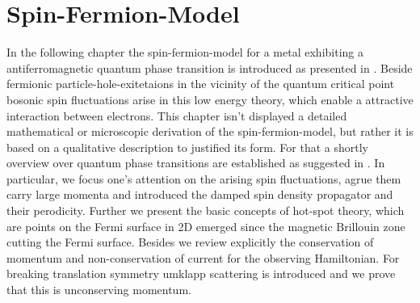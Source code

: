 %
%
%
\chapter{Spin-Fermion-Model}
\label{ch:spin fermion model}
%
%
%
In the following chapter the spin-fermion-model for a metal exhibiting a antiferromagnetic quantum phase transition is introduced as presented in \cite{Abanov&Chubukov&Schmalian}.
Beside fermionic particle-hole-exitetaions in the vicinity of the quantum critical point bosonic spin fluctuations arise in this low energy theory, which enable a attractive interaction between electrons.
This chapter isn't displayed a detailed mathematical or microscopic derivation of the spin-fermion-model, but rather it is based on a qualitative description to justified its form.
For that a shortly overview over quantum phase transitions are established as suggested in \cite{SachdevQCP}.
In particular, we focus one's attention on the arising spin fluctuations, agrue them carry large momenta and introduced the damped spin density propagator and their perodicity.
Further we present the basic concepts of hot-spot theory, which are points on the Fermi surface in 2D emerged since the magnetic Brillouin zone cutting the Fermi surface.
Besides we review explicitly the conservation of momentum and non-conservation of current for the observing Hamiltonian.
For breaking translation symmetry umklapp scattering is introduced and we prove that this is unconserving momentum.
%
%
